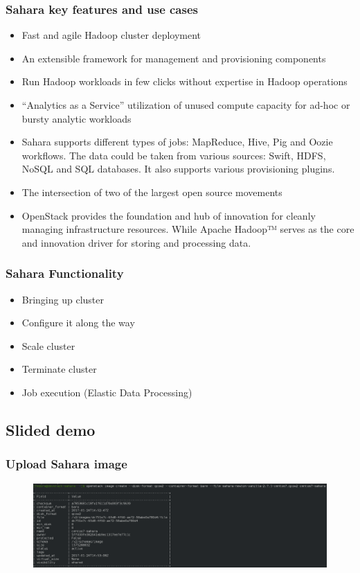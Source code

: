 \begin{frame}
	\frametitle{Sahara key features and use cases}
	\begin{itemize}
		\item Fast and agile Hadoop cluster deployment
		\item An extensible framework for management and provisioning components
		\item Run Hadoop workloads in few clicks without expertise in Hadoop operations
		\item “Analytics as a Service” utilization of unused compute capacity for ad-hoc or bursty analytic workloads
		\item Sahara supports different types of jobs: MapReduce, Hive, Pig and Oozie workflows. The data could be taken from various sources: Swift, HDFS, NoSQL and SQL databases. It also  supports various provisioning plugins.
		\item The intersection of two of the largest open source movements
		\item OpenStack provides  the foundation and hub of innovation for cleanly managing infrastructure resources. While Apache Hadoop™ serves as the core and innovation driver for storing and processing data.
	\end{itemize}
\end{frame}

\begin{frame}
	\frametitle{Sahara Functionality}
	\begin{itemize}
		\item Bringing up cluster
		\item Configure it along the way
		\item Scale cluster
		\item Terminate cluster
		\item Job execution (Elastic Data Processing)
	\end{itemize}
\end{frame}


\subsection{Slided demo} 
\begin{frame}
	\frametitle{Upload Sahara image}
	\begin{figure}
		\includegraphics[width=1\linewidth]{images/1-upload_sahara_image.png}
	\end{figure}
\end{frame}


